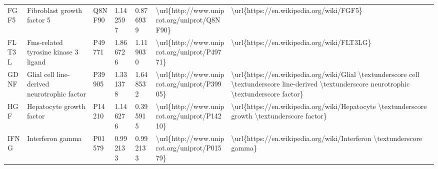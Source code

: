 \begin{table}[]
\begin{tabular}{lllllll}
\multicolumn{1}{l|}{FGF5}     & Fibroblast growth factor 5                                    & Q8NF90  & 1.142597           & 0.876939          & \textbackslash{}url\{http://www.uniprot.org/uniprot/Q8NF90\} & \textbackslash{}url\{https://en.wikipedia.org/wiki/FGF5\}                                                                                                                                                                                                                                          \\
\multicolumn{1}{l|}{FLT3L}    & Fms-related tyrosine kinase 3 ligand                          & P49771  & 1.866726           & 1.119030          & \textbackslash{}url\{http://www.uniprot.org/uniprot/P49771\} & \textbackslash{}url\{https://en.wikipedia.org/wiki/FLT3LG\}                                                                                                                                                                                                                                        \\
\multicolumn{1}{l|}{GDNF}     & Glial cell line-derived neurotrophic factor                   & P39905  & 1.331378           & 1.648532          & \textbackslash{}url\{http://www.uniprot.org/uniprot/P39905\} & \textbackslash{}url\{https://en.wikipedia.org/wiki/Glial \textbackslash{}textunderscore cell \textbackslash{}textunderscore line-derived \textbackslash{}textunderscore neurotrophic \textbackslash{}textunderscore factor\}                                                                       \\
\multicolumn{1}{l|}{HGF}      & Hepatocyte growth factor                                      & P14210  & 1.146276           & 0.395915          & \textbackslash{}url\{http://www.uniprot.org/uniprot/P14210\} & \textbackslash{}url\{https://en.wikipedia.org/wiki/Hepatocyte \textbackslash{}textunderscore growth \textbackslash{}textunderscore factor\}                                                                                                                                                        \\
\multicolumn{1}{l|}{IFNG}     & Interferon gamma                                              & P01579  & 0.992133           & 0.992133          & \textbackslash{}url\{http://www.uniprot.org/uniprot/P01579\} & \textbackslash{}url\{https://en.wikipedia.org/wiki/Interferon \textbackslash{}textunderscore gamma\}                                                                                                                                                                                               \\

\end{tabular}
\end{table}

